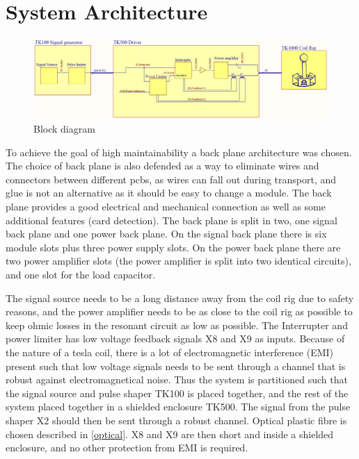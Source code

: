 \section{System Architecture}
\label{sa}

\begin{figure}
    \centering
    \includegraphics[width=\textwidth]{img/Blokkdiagram_detalj.PNG}
    \caption{Block diagram}
    \label{fig:blokksjema}
\end{figure}
To achieve the goal of high maintainability a back plane architecture was chosen. The choice of back plane is also defended as a way to eliminate wires and connectors between different pcbs, as wires can fall out during transport, and glue is not an alternative as it should be easy to change a module. The back plane provides a good electrical and mechanical connection as well as some additional features (card detection).
The back plane is split in two, one signal back plane and one power back plane. On the signal back plane there is six module slots plus three power supply slots. On the power back plane there are two power amplifier slots (the power amplifier is split into two identical circuits), and one slot for the load capacitor.

The signal source needs to be a long distance away from the coil rig due to safety reasons, and the power amplifier needs to be as close to the coil rig as possible to keep ohmic losses in the resonant circuit as low as possible. The Interrupter and power limiter has low voltage feedback signals X8 and X9 as inputs. Because of the nature of a tesla coil, there is a lot of electromagnetic interference (EMI) present such that low voltage signals needs to be sent through a channel that is robust against electromagnetical noise. Thus the system is partitioned such that the signal source and pulse shaper TK100 is placed together, and the rest of the system placed together in a shielded enclosure TK500. The signal from the pulse shaper X2 should then be sent through a robust channel. Optical plastic fibre is chosen described in \cref{optical}. X8 and X9 are then short and inside a shielded enclosure, and no other protection from EMI is required.

